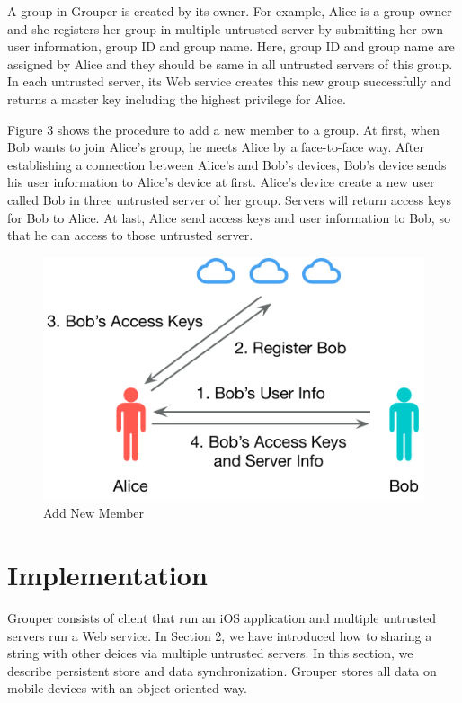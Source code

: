 \documentclass[twocolumn,10pt]{article}
\begin{document}
A group in Grouper is created by its owner. For example, Alice is a group owner and she registers her group in multiple untrusted server by submitting her own user information, group ID and group name. Here, group ID and group name are assigned by Alice and they should be same in all untrusted servers of this group. In each untrusted server, its Web service creates this new group successfully and returns a master key including the highest privilege for Alice.

Figure 3 shows the procedure to add a new member to a group. At first, when Bob wants to join Alice's group, he meets Alice by a face-to-face way. After establishing a connection between Alice's and Bob's devices, Bob's device sends his user information to Alice's device at first. Alice's device create a new user called Bob in three untrusted server of her group. Servers will return access keys for Bob to Alice. At last, Alice send access keys and user information to Bob, so that he can access to those untrusted server.

\begin{figure}[t]
	\centering
	\includegraphics[scale=0.35]{add_member}
	\caption{Add New Member}
\end{figure}

\section{Implementation}
Grouper consists of client that run an iOS application and multiple untrusted servers run a Web service. In Section 2, we have introduced how to sharing a string with other deices via multiple untrusted servers. In this section, we describe persistent store and data synchronization. Grouper stores all data on mobile devices with an object-oriented way.
\end{document}
